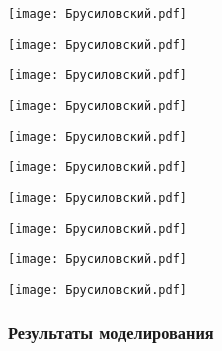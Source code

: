 \documentclass[main.tex]{subfiles}
\begin{document}
\begin{center}
\texttt{[image: Брусиловский.pdf]}
\end{center}



\begin{center}
\texttt{[image: Брусиловский.pdf]}
\end{center}



\begin{center}
\texttt{[image: Брусиловский.pdf]}
\end{center}



\begin{center}
\texttt{[image: Брусиловский.pdf]}
\end{center}



\begin{center}
\texttt{[image: Брусиловский.pdf]}
\end{center}



\begin{center}
\texttt{[image: Брусиловский.pdf]}
\end{center}



\begin{center}
\texttt{[image: Брусиловский.pdf]}
\end{center}



\begin{center}
\texttt{[image: Брусиловский.pdf]}
\end{center}



\begin{center}
\texttt{[image: Брусиловский.pdf]}
\end{center}



\begin{center}
\texttt{[image: Брусиловский.pdf]}
\end{center}



\subsubsection{Результаты моделирования}
\end{document}
